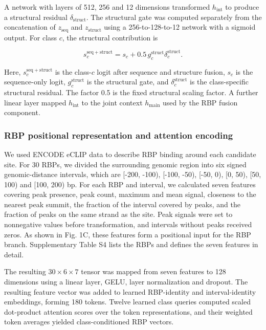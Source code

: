 \documentclass[unnumsec,webpdf,contemporary,large]{oup-authoring-template}
\begin{document}
A network with layers of 512, 256 and 12 dimensions transformed $h_{\mathrm{int}}$ to produce a structural residual $\delta_{\mathrm{struct}}$. The structural gate was computed separately from the concatenation of $z_{\mathrm{seq}}$ and $z_{\mathrm{struct}}$ using a 256-to-128-to-12 network with a sigmoid output. For class $c$, the structural contribution is

\begin{equation}
s^{\mathrm{seq+struct}}_c = s_c + 0.5\,g^{\mathrm{struct}}_c\delta^{\mathrm{struct}}_c.
\end{equation}

Here, $s^{\mathrm{seq+struct}}_c$ is the class-$c$ logit after sequence and structure fusion, $s_c$ is the sequence-only logit, $g^{\mathrm{struct}}_c$ is the structural gate, and $\delta^{\mathrm{struct}}_c$ is the class-specific structural residual. The factor 0.5 is the fixed structural scaling factor. A further linear layer mapped $h_{\mathrm{int}}$ to the joint context $h_{\mathrm{main}}$ used by the RBP fusion component.

\subsubsection{RBP positional representation and attention encoding}

We used ENCODE eCLIP \citep{ref23} data to describe RBP binding around each candidate site. For 30 RBPs, we divided the surrounding genomic region into six signed genomic-distance intervals, which are [-200, -100), [-100, -50), [-50, 0), [0, 50), [50, 100) and [100, 200) bp. For each RBP and interval, we calculated seven features covering peak presence, peak count, maximum and mean signal, closeness to the nearest peak summit, the fraction of the interval covered by peaks, and the fraction of peaks on the same strand as the site. Peak signals were set to nonnegative values before transformation, and intervals without peaks received zeros. As shown in Fig. 1C, these features form a positional input for the RBP branch. Supplementary Table S4 lists the RBPs and defines the seven features in detail.

The resulting $30\times6\times7$ tensor was mapped from seven features to 128 dimensions using a linear layer, GELU, layer normalization and dropout. The resulting feature vector was added to learned RBP-identity and interval-identity embeddings, forming 180 tokens. Twelve learned class queries computed scaled dot-product attention scores over the token representations, and their weighted token averages yielded class-conditioned RBP vectors.
\end{document}
